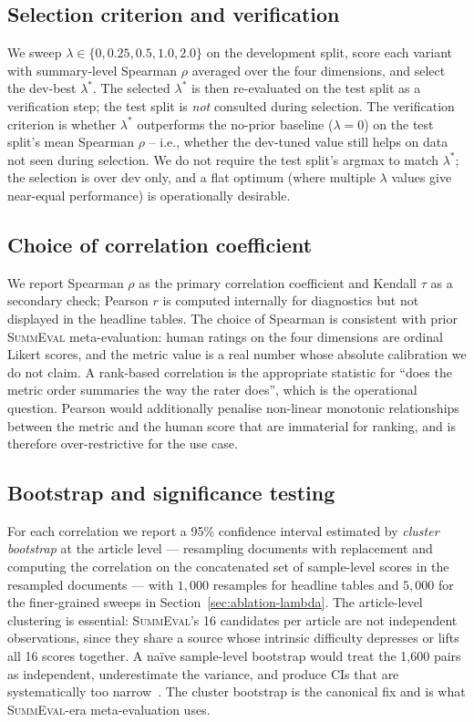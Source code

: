 \documentclass[journal]{IEEEtran}
\begin{document}
\subsection{Selection criterion and verification}
We sweep
$\lambda \in \{0, 0.25, 0.5, 1.0, 2.0\}$ on the development split,
score each variant with summary-level Spearman $\rho$ averaged
over the four dimensions, and select the dev-best $\lambda^*$. The
selected $\lambda^*$ is then re-evaluated on the test split as a
verification step; the test split is \emph{not} consulted during
selection. The verification criterion is whether
$\lambda^*$ outperforms the no-prior baseline ($\lambda=0$) on the
test split's mean Spearman $\rho$ -- i.e., whether the dev-tuned
value still helps on data not seen during selection. We do not
require the test split's argmax to match $\lambda^*$; the
selection is over dev only, and a flat optimum (where multiple
$\lambda$ values give near-equal performance) is operationally
desirable.

\subsection{Choice of correlation coefficient}
\label{sec:methodology-corr}
We report Spearman $\rho$ as the primary correlation coefficient
and Kendall $\tau$ as a secondary check; Pearson $r$ is computed
internally for diagnostics but not displayed in the headline
tables. The choice of Spearman is consistent with prior
\textsc{SummEval} meta-evaluation: human ratings on the four
dimensions are ordinal Likert scores, and the metric value is a
real number whose absolute calibration we do not claim. A
rank-based correlation is the appropriate statistic for ``does
the metric order summaries the way the rater does'', which is
the operational question. Pearson would additionally penalise
non-linear monotonic relationships between the metric and the
human score that are immaterial for ranking, and is therefore
over-restrictive for the use case.

\subsection{Bootstrap and significance testing}
\label{sec:methodology-bootstrap}
For each correlation we report a 95\% confidence interval
estimated by \emph{cluster bootstrap} at the article level
--- resampling documents with replacement and computing the
correlation on the concatenated set of sample-level scores in
the resampled documents --- with $1{,}000$ resamples for
headline tables and $5{,}000$ for the finer-grained sweeps in
Section~\ref{sec:ablation-lambda}. The article-level clustering
is essential: \textsc{SummEval}'s 16 candidates per article are
not independent observations, since they share a source whose
intrinsic difficulty depresses or lifts all 16 scores together.
A naïve sample-level bootstrap would treat the 1{,}600 pairs as
independent, underestimate the variance, and produce CIs that
are systematically too narrow~\cite{efron1993bootstrap}. The
cluster bootstrap is the canonical fix and is what
\textsc{SummEval}-era meta-evaluation uses.
\end{document}
